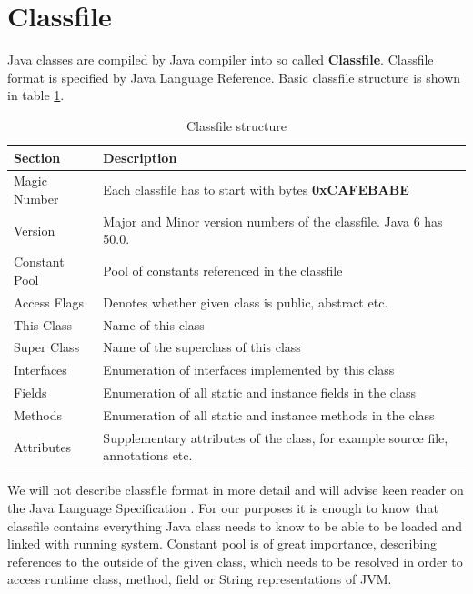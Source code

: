 \documentclass[11pt,twoside,a4paper]{book}
\begin{document}
\section{Classfile}
\label{sec:classfile}

Java classes are compiled by Java compiler into so called \textbf{Classfile}. Classfile format is specified by Java Language Reference.\cite[chapter~4]{vmspec} Basic classfile structure is shown in table \ref{tab:classfile}.

\begin{table}
	\centering
	\begin{tabular}{|l|p{11cm}|}
		\hline
		Section & Description \\
		\hline
		\hline
		Magic Number & Each classfile has to start with bytes \textbf{0xCAFEBABE} \\
		\hline
		Version & Major and Minor version numbers of the classfile. Java 6 has 50.0. \\
		\hline
		Constant Pool & Pool of constants referenced in the classfile \\
		\hline
		Access Flags & Denotes whether given class is public, abstract etc. \\
		\hline
		This Class & Name of this class \\
		\hline
		Super Class & Name of the superclass of this class \\
		\hline
		Interfaces & Enumeration of interfaces implemented by this class\\
		\hline
		Fields & Enumeration of all static and instance fields in the class\\
		\hline
		Methods & Enumeration of all static and instance methods in the class\\
		\hline
		Attributes & Supplementary attributes of the class, for example source file, annotations etc.\\
		\hline
	\end{tabular}
	\caption{Classfile structure}
	\label{tab:classfile}
\end{table}

We will not describe classfile format in more detail and will advise keen reader on the Java Language Specification \cite{vmspec}. 
For our purposes it is enough to know that classfile contains everything Java class needs to know to be able to be loaded and linked with running system. 
Constant pool is of great importance, describing references to the outside of the given class, which needs to be resolved in order to access runtime class, method, field or String representations of JVM.
\end{document}
